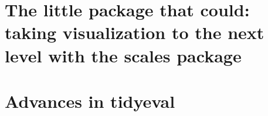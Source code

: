 \documentclass[]{book}
\begin{document}
\hypertarget{the-little-package-that-could-taking-visualization-to-the-next-level-with-the-scales-package}{%
\section{The little package that could: taking visualization to the next level with the scales package}\label{the-little-package-that-could-taking-visualization-to-the-next-level-with-the-scales-package}}

\hypertarget{advances-in-tidyeval}{%
\section{Advances in tidyeval}\label{advances-in-tidyeval}}

\hypertarget{section}{%
\section{}\label{section}}


\end{document}
